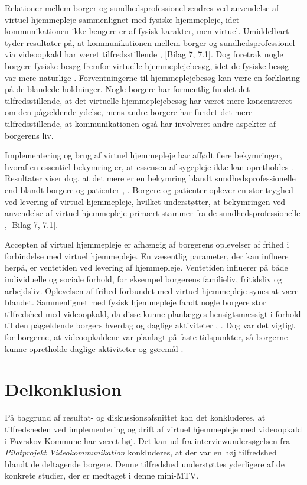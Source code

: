 Relationer mellem borger og sundhedsprofessionel ændres ved anvendelse af virtuel hjemmepleje sammenlignet med fysiske hjemmepleje, idet kommunikationen ikke længere er af fysisk karakter, men virtuel. Umiddelbart tyder resultater på, at kommunikationen mellem borger og sundhedsprofessionel via videoopkald har været tilfredsstillende \cite{Baf2}, [Bilag 7, 7.1]. Dog foretrak nogle borgere fysiske besøg fremfor virtuelle hjemmeplejebesøg, idet de fysiske besøg var mere naturlige \cite{kandidat}. 
Forventningerne til hjemmeplejebesøg kan være en forklaring på de blandede holdninger. Nogle borgere har formentlig fundet det tilfredsstillende, at det virtuelle hjemmeplejebesøg har været mere koncentreret om den pågældende ydelse, mens andre borgere har fundet det mere tilfredsstillende, at kommunikationen også har involveret andre aspekter af borgerens liv.

Implementering og brug af virtuel hjemmepleje har affødt flere bekymringer, hvoraf en essentiel bekymring er, at essensen af sygepleje ikke kan opretholdes \cite{telenursing}. Resultater viser dog, at det mere er en bekymring blandt sundhedsprofessionelle end blandt borgere og patienter \cite{telenursing}, \cite{Mair}. Borgere og patienter oplever en stor tryghed ved levering af virtuel hjemmepleje, hvilket understøtter, at bekymringen ved anvendelse af virtuel hjemmepleje primært stammer fra de sundhedsprofessionelle \cite{Baf2}, [Bilag 7, 7.1]. 

Accepten af virtuel hjemmepleje er afhængig af borgerens oplevelser af frihed i forbindelse med virtuel hjemmepleje. En væsentlig parameter, der kan influere herpå, er ventetiden ved levering af hjemmepleje. Ventetiden influerer på både individuelle og sociale forhold, for eksempel borgerens familieliv, fritidsliv og arbejdsliv. Oplevelsen af frihed forbundet med virtuel hjemmepleje synes at være blandet. Sammenlignet med fysisk hjemmepleje fandt nogle borgere stor tilfredshed med videoopkald, da disse kunne planlægges hensigtsmæssigt i forhold til den pågældende borgers hverdag og daglige aktiviteter \cite{kandidat}, \cite{wade}. Dog var det vigtigt for borgerne, at videoopkaldene var planlagt på faste tidspunkter, så borgerne kunne opretholde daglige aktiviteter og gøremål \cite{kandidat}.

\section{Delkonklusion}
På baggrund af resultat- og diskussionsafsnittet kan det konkluderes, at tilfredsheden ved implementering og drift af virtuel hjemmepleje med videoopkald i Favrskov Kommune har været høj. Det kan ud fra interviewundersøgelsen fra \textit{Pilotprojekt Videokommunikation} konkluderes, at der var en høj tilfredshed blandt de deltagende borgere. Denne tilfredshed understøttes yderligere af de konkrete studier, der er medtaget i denne mini-MTV.


